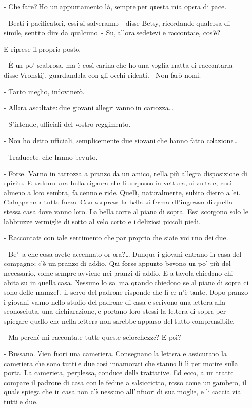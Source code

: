 - Che fare? Ho un appuntamento là, sempre per questa mia opera di pace. 

- Beati i pacificatori, essi si salveranno - disse Betsy, ricordando qualcosa di simile, sentito dire da qualcuno. - Su, allora sedetevi e raccontate, cos'è? 

E riprese il proprio posto. 

\label{v-1} 

- È un po' scabrosa, ma è così carina che ho una voglia matta di raccontarla - disse Vronskij, guardandola con gli occhi ridenti. - Non farò nomi. 

- Tanto meglio, indovinerò. 

- Allora ascoltate: due giovani allegri vanno in carrozza\ldots{} 

- S'intende, ufficiali del vostro reggimento. 

- Non ho detto ufficiali, semplicemente due giovani che hanno fatto colazione\ldots{} 

- Traducete: che hanno bevuto. 

- Forse. Vanno in carrozza a pranzo da un amico, nella più allegra disposizione di spirito. E vedono una bella signora che li sorpassa in vettura, si volta e, così almeno a loro sembra, fa cenno e ride. Quelli, naturalmente, subito dietro a lei. Galoppano a tutta forza. Con sorpresa la bella si ferma all'ingresso di quella stessa casa dove vanno loro. La bella corre al piano di sopra. Essi scorgono solo le labbruzze vermiglie di sotto al velo corto e i deliziosi piccoli piedi. 

- Raccontate con tale sentimento che par proprio che siate voi uno dei due. 

- Be', a che cosa avete accennato or ora?\ldots{} Dunque i giovani entrano in casa del compagno; c'è un pranzo di addio. Qui forse appunto bevono un po' più del necessario, come sempre avviene nei pranzi di addio. E a tavola chiedono chi abita su in quella casa. Nessuno lo sa, ma quando chiedono se al piano di sopra ci sono delle mamzel', il servo del padrone risponde che lì ce n'è tante. Dopo pranzo i giovani vanno nello studio del padrone di casa e scrivono una lettera alla sconosciuta, una dichiarazione, e portano loro stessi la lettera di sopra per spiegare quello che nella lettera non sarebbe apparso del tutto comprensibile. 

- Ma perché mi raccontate tutte queste sciocchezze? E poi? 

- Bussano. Vien fuori una cameriera. Consegnano la lettera e assicurano la cameriera che sono tutti e due così innamorati che stanno lì lì per morire sulla porta. La cameriera, perplessa, conduce delle trattative. Ed ecco, a un tratto compare il padrone di casa con le fedine a salsicciotto, rosso come un gambero, il quale spiega che in casa non c'è nessuno all'infuori di sua moglie, e li caccia via tutti e due. 

